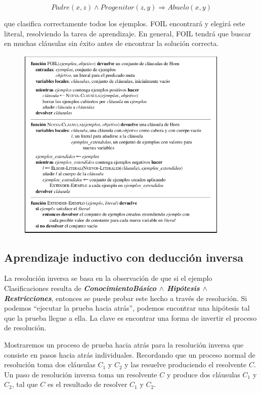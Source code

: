 \documentclass[12 pt, a4paper]{article}
\begin{document}
					$$Padre(x, z) \land Progenitor(z, y) \Rightarrow Abuelo(x, y)$$
					
				que clasifica correctamente todos los ejemplos. FOIL encontrará y elegirá este literal, resolviendo la tarea de aprendizaje. En general, FOIL tendrá que buscar en muchas cláusulas sin éxito antes de encontrar la solución correcta.
				\begin{figure}[h]
					\centering
					\includegraphics[width=0.9\textwidth]{./section3/fig7.png}
				\end{figure}
		\subsection{Aprendizaje inductivo con deducción inversa}
		La resolución inversa se basa en la observación de que si el ejemplo Clasificaciones resulta de \textbf{\textit{ConocimientoBásico $\land$ Hipótesis $\land$ Restricciones}}, entonces se puede probar este hecho a través de resolución. Si podemos ``ejecutar la prueba hacia atrás'', podemos encontrar una hipótesis tal que la prueba llegue a ella. La clave es encontrar una forma de invertir el proceso de resolución.	
		
		Mostraremos un proceso de prueba hacia atrás para la resolución inversa que consiste en pasos hacia atrás individuales. 
Recordando que un proceso normal de resolución toma dos cláusulas $C_{1}$ y $C_{2}$ y las resuelve produciendo el resolvente $C$.
Un paso de resolución inversa toma un resolvente $C$ y produce dos cláusulas $C_{1}$ y $C_{2}$, tal que $C$ es el resultado de resolver $C_{1}$ y $C_{2}$. 
	
\end{document}
